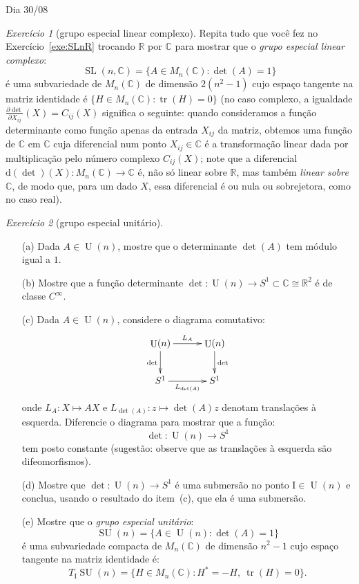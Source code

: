 \documentclass[oneside,11pt]{amsart}
\newcommand{\R}{\mathds R}
\newcommand{\C}{\mathds C}
\newcommand{\dd}{\mathrm d}
\newcommand{\I}{\mathrm I}
\DeclareMathOperator{\Ur}{U}
\DeclareMathOperator{\SL}{SL}
\DeclareMathOperator{\SU}{SU}
\DeclareMathOperator{\tr}{tr}
\theoremstyle{remark}\newtheorem{exercise}{Exercício}[section]
\theoremstyle{plain}\newtheorem{teo}{Teorema}[section]
\theoremstyle{plain}\newtheorem{lem}[teo]{Lema}
\theoremstyle{plain}\newtheorem{prop}[teo]{Proposição}
\theoremstyle{definition}\newtheorem{defin}[teo]{Definição}
\theoremstyle{remark}\newtheorem{rem}[teo]{Observação}
\theoremstyle{definition}\newtheorem{example}[teo]{Exemplo}
\numberwithin{equation}{section}
\begin{document}
\begin{section}{Dia 30/08}
\begin{exercise}[grupo especial linear complexo]
Repita tudo que você fez no Exercício~\ref{exe:SLnR} trocando $\R$ por $\C$ para mostrar que o
{\em grupo especial linear complexo}:
\[\SL(n,\C)=\big\{A\in M_n(\C):\det(A)=1\big\}\]
é uma subvariedade de $M_n(\C)$ de dimensão $2(n^2-1)$ cujo espaço tangente na matriz identidade é
$\big\{H\in M_n(\C):\tr(H)=0\big\}$ (no caso complexo, a igualdade $\frac{\partial\det}{\partial X_{ij}}(X)=C_{ij}(X)$
significa o seguinte: quando consideramos a função determinante como função apenas da entrada $X_{ij}$ da matriz, obtemos
uma função de $\C$ em $\C$ cuja diferencial num ponto $X_{ij}\in\C$ é a transformação linear dada por multiplicação
pelo número complexo $C_{ij}(X)$; note que a diferencial $\dd(\det)(X):M_n(\C)\to\C$ é, não só linear sobre $\R$,
mas também {\em linear sobre $\C$}, de modo que, para um dado $X$, essa diferencial é ou nula ou sobrejetora,
como no caso real).
\end{exercise}

\begin{exercise}[grupo especial unitário]\
\begin{itemize}
\item[(a)] Dada $A\in\Ur(n)$, mostre que o determinante $\det(A)$ tem módulo igual a $1$.
\item[(b)] Mostre que a função determinante $\det:\Ur(n)\to S^1\subset\C\cong\R^2$ é de classe $C^\infty$.
\item[(c)] Dada $A\in\Ur(n)$, considere o diagrama comutativo:
\[\xymatrix@C+5pt{%
\Ur(n)\ar[r]^{L_A}\ar[d]_{\det}&\Ur(n)\ar[d]^{\det}\\
S^1\ar[r]_{L_{\det(A)}}&S^1}\]
onde $L_A:X\mapsto AX$ e $L_{\det(A)}:z\mapsto\det(A)z$ denotam translações à esquerda. Diferencie o diagrama
para mostrar que a função:
\[\det:\Ur(n)\longrightarrow S^1\]
tem posto constante (sugestão: observe que as translações à esquerda são difeomorfismos).
\item[(d)] Mostre que $\det:\Ur(n)\to S^1$ é uma submersão no ponto $\I\in\Ur(n)$ e conclua, usando o resultado
do item~(c), que ela é uma submersão.
\item[(e)] Mostre que o {\em grupo especial unitário}:
\[\SU(n)=\big\{A\in\Ur(n):\det(A)=1\big\}\]
é uma subvariedade compacta de $M_n(\C)$ de dimensão $n^2-1$ cujo espaço tangente na matriz identidade é:
\[T_\I\!\SU(n)=\big\{H\in M_n(\C):H^*=-H,\ \tr(H)=0\big\}.\]
\end{itemize}
\end{exercise}


\end{section}
\end{document}
